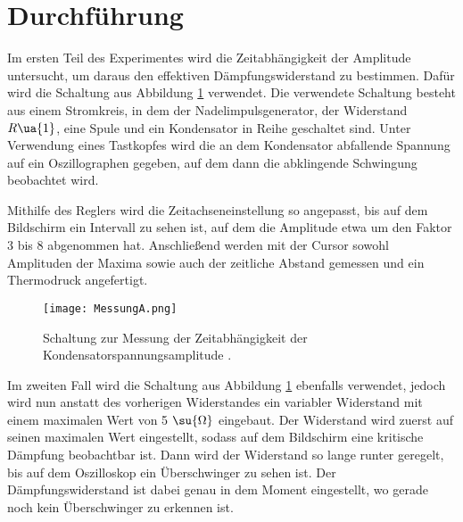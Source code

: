 \newpage

\section{Durchführung}

Im ersten Teil des Experimentes wird die Zeitabhängigkeit der Amplitude untersucht,
um daraus den effektiven Dämpfungswiderstand zu bestimmen. Dafür wird die Schaltung
aus Abbildung \ref{fig:MessungA} verwendet. Die verwendete Schaltung besteht aus
einem Stromkreis, in dem der Nadelimpulsgenerator, der Widerstand $R\ua{1}$, eine
Spule und ein Kondensator in Reihe geschaltet sind. Unter Verwendung eines Tastkopfes wird die an
dem Kondensator abfallende Spannung auf ein Oszillographen gegeben, auf dem dann
die abklingende Schwingung beobachtet wird.

Mithilfe des Reglers wird die Zeitachseneinstellung so angepasst, bis
auf dem Bildschirm ein Intervall zu sehen ist, auf dem die Amplitude etwa um
den Faktor 3 bis 8 abgenommen hat. Anschließend werden mit der Cursor sowohl
Amplituden der Maxima sowie auch der zeitliche Abstand gemessen und ein Thermodruck
angefertigt.

\FloatBarrier
\begin{figure}
  \centering
  \texttt{[image: MessungA.png]}
  \caption{Schaltung zur Messung der Zeitabhängigkeit der Kondensatorspannungsamplitude \cite{anleitung01}.}
  \label{fig:MessungA}
\end{figure}
\FloatBarrier


Im zweiten Fall wird die Schaltung aus Abbildung \ref{fig:MessungA} ebenfalls
verwendet, jedoch wird nun anstatt des vorherigen Widerstandes ein variabler
Widerstand mit einem maximalen Wert von 5 $\su{\Omega}$ eingebaut. Der Widerstand wird
zuerst auf seinen maximalen Wert eingestellt, sodass auf dem Bildschirm eine
kritische Dämpfung beobachtbar ist. Dann wird der Widerstand so lange runter geregelt, bis
auf dem Oszilloskop ein Überschwinger zu sehen ist. Der Dämpfungswiderstand ist
dabei genau in dem Moment eingestellt, wo gerade noch kein Überschwinger zu erkennen
ist.

\newpage

